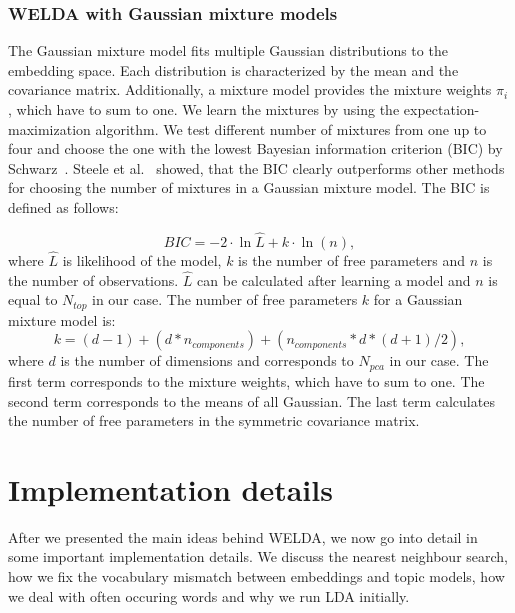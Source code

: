 \documentclass[
        a4paper,
        titlepage,
        twoside,
        parskip,
        numbers=noenddot
        ]{scrbook}
\theoremstyle{break}
\begin{document}
\subsubsection{WELDA with Gaussian mixture models}
The Gaussian mixture model fits multiple Gaussian distributions to the embedding space.
Each distribution is characterized by the mean and the covariance matrix.
Additionally, a mixture model provides the mixture weights $\pi_i$, which have to sum to one.
We learn the mixtures by using the expectation-maximization algorithm.
We test different number of mixtures from one up to four and choose the one with the lowest Bayesian information criterion (BIC) by Schwarz~\cite{Schwarz1978}.
Steele et al.~\cite{Steele2009} showed, that the BIC clearly outperforms other methods for choosing the number of mixtures in a Gaussian mixture model.
The BIC is defined as follows:

\begin{equation*}
  BIC = {-2 \cdot \ln{\hat L} + k \cdot \ln(n)},
\end{equation*}
where $\hat{L}$ is likelihood of the model, $k$ is the number of free parameters and $n$ is the number of observations.
$\hat{L}$ can be calculated after learning a model and $n$ is equal to $N_{top}$ in our case.
The number of free parameters $k$ for a Gaussian mixture model is:
\begin{equation*}
  k = (d - 1) + (d * n_{components}) + (n_{components} * d * (d + 1)/2),
\end{equation*}
where $d$ is the number of dimensions and corresponds to $N_{pca}$ in our case.
The first term corresponds to the mixture weights, which have to sum to one.
The second term corresponds to the means of all Gaussian.
The last term calculates the number of free parameters in the symmetric covariance matrix.

\section{Implementation details}

After we presented the main ideas behind WELDA, we now go into detail in some important implementation details.
We discuss the nearest neighbour search, how we fix the vocabulary mismatch between embeddings and topic models, how we deal with often occuring words and why we run LDA initially.
\end{document}
